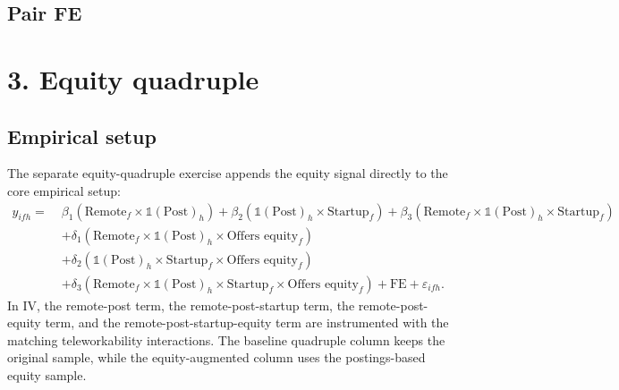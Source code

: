 \documentclass{article}
\newcommand{\cleanedresultsdir}{../../results/cleaned/tex}
\newcommand{\TableInput}[1]{}
\newcommand{\FloatNote}[1]{%
  \begingroup
    \captionsetup{style=noteflush}%
    \caption*{\textit{Notes:}~#1}%
  \endgroup
}
\begin{document}
\subsection*{Pair FE}
\begin{table}[H]
  \centering
  \caption{User productivity startup-swapped horse race, pair FE, local-support samples}
  \TableInput{\cleanedresultsdir/llm_equity_postings_coverage_horse_race_pairfe.tex}
  \FloatNote{Columns mirror the current pair-FE horse-race structure: baseline, firm growth only, equity only, and both. The growth channel uses the same firm-level median split of average post-COVID employment growth as in Table 2. The equity channel uses the postings-based equity sample under firm$\times$individual and half-year fixed effects. The baseline column is left on the original sample, and the combined column uses the intersection of the growth and equity supports. Standard errors are clustered by worker.}
\end{table}

\section*{3. Equity quadruple}

\subsection*{Empirical setup}
\noindent The separate equity-quadruple exercise appends the equity signal directly to the core empirical setup:
\[
  \begin{aligned}
    y_{ifh} =\; & \beta_1 \left( \text{Remote}_f \times \mathds{1}(\text{Post})_h \right)
    + \beta_2 \left( \mathds{1}(\text{Post})_h \times \text{Startup}_f \right)
    + \beta_3 \left( \text{Remote}_f \times \mathds{1}(\text{Post})_h \times \text{Startup}_f \right) \\
    & + \delta_1 \left( \text{Remote}_f \times \mathds{1}(\text{Post})_h \times \text{Offers equity}_f \right) \\
    & + \delta_2 \left( \mathds{1}(\text{Post})_h \times \text{Startup}_f \times \text{Offers equity}_f \right) \\
    & + \delta_3 \left( \text{Remote}_f \times \mathds{1}(\text{Post})_h \times \text{Startup}_f \times \text{Offers equity}_f \right)
    + \text{FE} + \varepsilon_{ifh} .
  \end{aligned}
\]
\noindent In IV, the remote-post term, the remote-post-startup term, the remote-post-equity term, and the remote-post-startup-equity term are instrumented with the matching teleworkability interactions. The baseline quadruple column keeps the original sample, while the equity-augmented column uses the postings-based equity sample.
\end{document}
